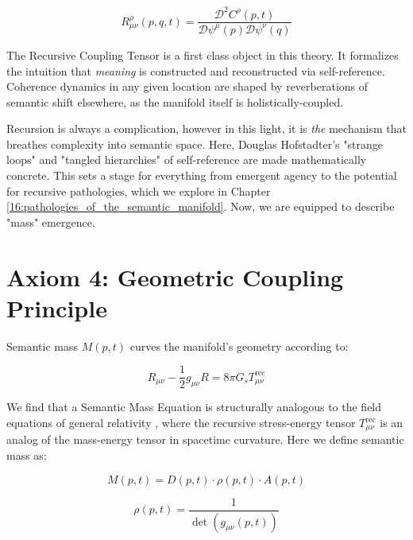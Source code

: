 \begin{equation}
R^\rho_{\mu\nu}(p,q,t) = \frac{\mathcal{D}^2 C^\rho(p,t)}{\mathcal{D} \psi^\mu(p) \mathcal{D} \psi^\nu(q)}
\end{equation}

The Recursive Coupling Tensor is a first class object in this theory. It formalizes the intuition that \textit{meaning} is constructed and reconstructed via self-reference. Coherence dynamics in any given location are shaped by reverberations of semantic shift elsewhere, as the manifold itself is holistically-coupled.

Recursion is always a complication, however in this light, it is \textit{the} mechanism that breathes complexity into semantic space. Here, Douglas Hofstadter's "strange loops" and "tangled hierarchies" of self-reference \autocite{Hofstadter1979} are made mathematically concrete. This sets a stage for everything from emergent agency to the potential for recursive pathologies, which we explore in Chapter \ref{16:pathologies_of_the_semantic_manifold}. Now, we are equipped to describe "mass" emergence.


\section{Axiom 4: Geometric Coupling Principle}
\label{1.4:axiom_4_geometric_coupling_principle}

Semantic mass \(M(p,t)\) curves the manifold's geometry according to:

\begin{equation}
R_{\mu\nu} - \frac{1}{2}g_{\mu\nu}R = 8\pi G_s T^{\text{rec}}_{\mu\nu}
\end{equation}

We find that a Semantic Mass Equation is structurally analogous to the field equations of general relativity \autocite{Einstein1915, MisnerThorneWheeler1973, Wald1984}, where the recursive stress-energy tensor \(T^{\text{rec}}_{\mu\nu}\) is an analog of the mass-energy tensor in spacetime curvature. Here we define semantic mass as:

\begin{equation}
M(p,t) = D(p,t) \cdot \rho(p,t) \cdot A(p,t)
\end{equation}

\begin{equation}
\rho(p,t) = \frac{1}{\det(g_{\mu\nu}(p,t))}
\end{equation}

